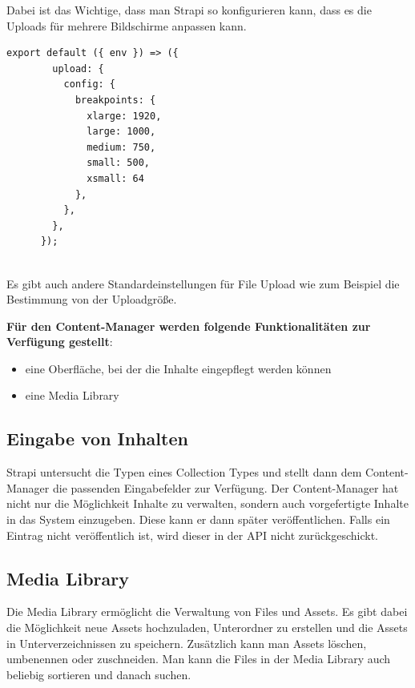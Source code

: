 Dabei ist das Wichtige, dass man Strapi so konfigurieren kann, dass es die Uploads für mehrere Bildschirme anpassen kann.
\begin{lstlisting}[caption=file upload config in strapi]
    export default ({ env }) => ({
        upload: {
          config: {
            breakpoints: {
              xlarge: 1920,
              large: 1000,
              medium: 750,
              small: 500,
              xsmall: 64
            },
          },
        },
      });
    
\end{lstlisting}
Es gibt auch andere Standardeinstellungen für File Upload wie zum Beispiel die Bestimmung von der Uploadgröße.
\cite{upload}


\textbf{Für den Content-Manager werden folgende Funktionalitäten zur Verfügung gestellt}:
\begin{itemize}
  \item eine Oberfläche, bei der die Inhalte eingepflegt werden können
  \item eine Media Library
\end{itemize}


\subsection{Eingabe von Inhalten}
Strapi untersucht die Typen eines Collection Types und stellt dann dem Content-Manager die passenden 
Eingabefelder zur Verfügung. Der Content-Manager hat nicht nur die Möglichkeit Inhalte zu verwalten, sondern 
auch vorgefertigte Inhalte in das System einzugeben. Diese kann er dann später veröffentlichen. Falls ein Eintrag 
nicht veröffentlich ist, wird dieser in der API nicht zurückgeschickt.

\subsection{Media Library}

Die Media Library ermöglicht die Verwaltung von Files und Assets.
Es gibt dabei die Möglichkeit neue Assets hochzuladen, Unterordner zu erstellen und die Assets in Unterverzeichnissen zu speichern. 
Zusätzlich kann man Assets löschen, umbenennen oder zuschneiden.
Man kann die Files in der Media Library auch beliebig sortieren und danach suchen.
\cite{media-library}

